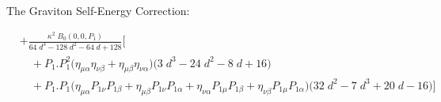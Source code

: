 \documentclass[aspectratio=169,usenames,dvipsnames]{beamer}
\begin{document}
\begin{frame}{\centering {}\\
    \small The Graviton Self-Energy Correction:}
\begin{tcolorbox}[enhanced,width=\textwidth,colframe=LUCopper,arc=4pt,boxrule=1pt,drop
  fuzzy shadow]
\begin{align*}
& + \frac{\kappa^2 \; B_0(0,0,P_1)}{64 \; d^3 - 128 \; d^2 - 64 \; d + 128}    \Big  [  \\
& \quad      + P_1.P_1^2 \big ( \eta_{\mu\alpha} \eta_{\nu\beta} + \eta_{\mu\beta} \eta_{\nu\alpha} \big )  \big (3 \; d^3 - 24 \; d^2 - 8 \; d + 16 \big ) \\
& \quad      + P_1.P_1 \big ( \eta_{\mu\alpha} P_{1\nu} P_{1\beta} + \eta_{\mu\beta} P_{1\nu} P_{1\alpha} + \eta_{\nu\alpha} P_{1\mu} P_{1\beta} + \eta_{\nu\beta} P_{1\mu} P_{1\alpha}   \big )  \big ( 32 \; d^2 - 7 \; d^3 + 20 \; d - 16 \big )  \Big ]
\end{align*}  
\end{tcolorbox}
\scriptsize\begin{columns}
  \begin{column}{0.3\textwidth}
  \centering{}    
  \end{column}
  \begin{column}{0.4\textwidth}
  \end{column}
  \begin{column}{0.3\textwidth}
  \centering{}    
  \end{column}
\end{columns}

\vspace{100mm}
\end{frame}


\end{document}
